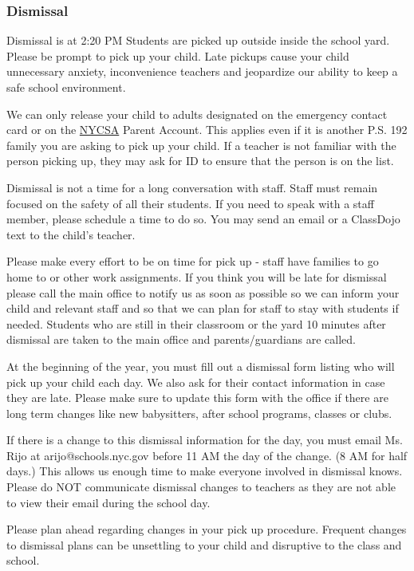 \documentclass[11pt]{article}
\begin{document}
\subsubsection{Dismissal}
\label{sec:org9bf97db}
Dismissal is at 2:20 PM Students are picked up outside inside the school yard. Please be prompt to pick up your child. Late pickups cause your child unnecessary anxiety, inconvenience teachers and jeopardize our ability to keep a safe school environment.

We can only release your child to adults designated on the emergency contact card or on the \href{https://www.schoolsaccount.nyc/}{NYCSA} Parent Account. This applies even if it is another P.S. 192 family you are asking to pick up your child. If a teacher is not familiar with the person picking up, they may ask for ID to ensure that the person is on the list.

Dismissal is not a time for a long conversation with staff. Staff must remain focused on the safety of all their students. If you need to speak with a staff member, please schedule a time to do so. You may send an email or a ClassDojo text to the child’s teacher.

Please make every effort to be on time for pick up - staff have families to go home to or other work assignments. If you think you will be late for dismissal please call the main office to notify us as soon as possible so we can inform your child and relevant staff and so that we can plan for staff to stay with students if needed. Students who are still in their classroom or the yard 10 minutes after dismissal are taken to the main office and parents/guardians are called.

At the beginning of the year, you must fill out a dismissal form listing who will pick up your child each day. We also ask for their contact information in case they are late. Please make sure to update this form with the office if there are long term changes like new babysitters, after school programs, classes or clubs.

If there is a change to this dismissal information for the day, you must email Ms. Rijo at arijo@schools.nyc.gov before 11 AM the day of the change. (8 AM for half days.) This allows us enough time to make everyone involved in dismissal knows. Please do NOT communicate dismissal changes to teachers as they are not able to view their email during the school day.

Please plan ahead regarding changes in your pick up procedure. Frequent changes to dismissal plans can be unsettling to your child and disruptive to the class and school.
\end{document}
